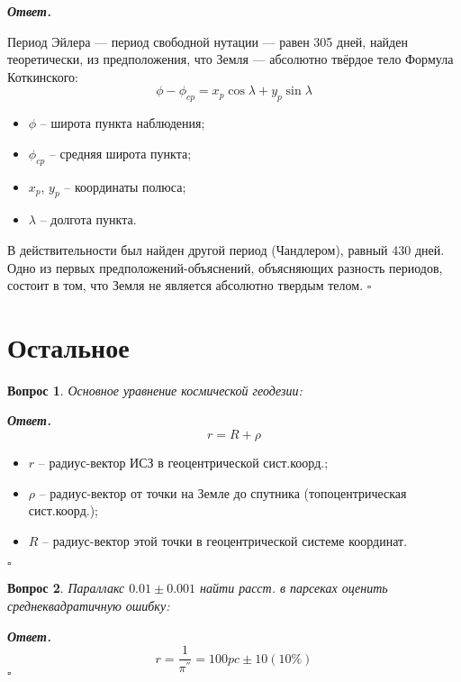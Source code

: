\documentclass[12pt]{article}
\newtheorem{problem}{Вопрос}
\newenvironment{solution}[1][\it{Ответ}]{\textbf{#1. } }{$\square$}
\begin{document}
		\begin{solution}
			
			Период Эйлера — период свободной нутации — равен 305 дней, найден теоретически, из
			предположения, что Земля — абсолютно твёрдое тело Формула Коткинского:
			$$\phi - \phi_{cp}=x_p \cos\lambda + y_p\sin\lambda$$
			\begin{itemize}
				\item $\phi$ -- широта пункта наблюдения;
				\item $\phi_{cp}$ -- средняя широта пункта;
				\item $x_p$, $y_p$ -- координаты полюса;
				\item $\lambda$ -- долгота пункта.
			\end{itemize}
			
			В действительности был найден другой период (Чандлером), равный 430 дней. Одно из
			первых предположений-объяснений, объясняющих разность периодов, состоит в том, что
			Земля не является абсолютно твердым телом.
		\end{solution}
		
\section{Остальное}
		\begin{problem}
			Основное уравнение космической геодезии:
		\end{problem}
		
		\begin{solution}
			$$r = R + \rho$$
			\begin{itemize}
				\item $r$ -- радиус-вектор ИСЗ в геоцентрической сист.коорд.;
				\item $\rho$ -- радиус-вектор от точки на Земле до спутника (топоцентрическая сист.коорд.);
				\item $R$ -- радиус-вектор этой точки в геоцентрической системе координат.
			\end{itemize}
		\end{solution}
		
		\begin{problem}
			Параллакс $0.01 \pm 0.001$ найти расст. в парсеках оценить среднеквадратичную ошибку:
		\end{problem}
		
		\begin{solution}
			$$r = \frac{1}{\pi^{''}} = 100 pc \pm 10 ( 10\%)$$
		\end{solution}
		
\end{document}
